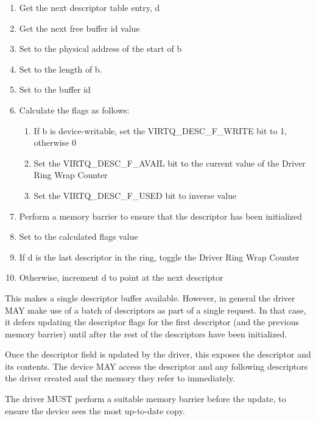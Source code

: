 \begin{enumerate}
\item Get the next descriptor table entry, d
\item Get the next free buffer id value
\item Set  to the physical address of the start of b
\item Set  to the length of b.
\item Set  to the buffer id
\item Calculate the flags as follows:
\begin{enumerate}
\item If b is device-writable, set the VIRTQ_DESC_F_WRITE bit to 1, otherwise 0
\item Set the VIRTQ_DESC_F_AVAIL bit to the current value of the Driver Ring Wrap Counter
\item Set the VIRTQ_DESC_F_USED bit to inverse value
\end{enumerate}
\item Perform a memory barrier to ensure that the descriptor has
      been initialized
\item Set  to the calculated flags value
\item If d is the last descriptor in the ring, toggle the
      Driver Ring Wrap Counter
\item Otherwise, increment d to point at the next descriptor
\end{enumerate}

This makes a single descriptor buffer available. However, in
general the driver MAY make use of a batch of descriptors as part
of a single request. In that case, it defers updating
the descriptor flags for the first descriptor
(and the previous memory barrier) until after the rest of
the descriptors have been initialized.

Once the descriptor  field is updated by the driver, this exposes
the descriptor and its contents.  The device MAY
access the descriptor and any following descriptors the driver created and the
memory they refer to immediately.

The driver MUST perform a suitable memory barrier before the
 update, to ensure the
device sees the most up-to-date copy.

